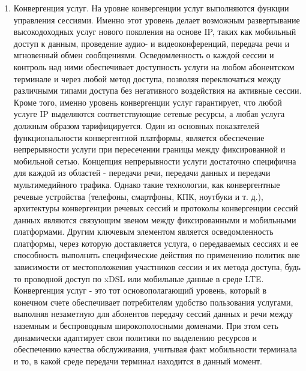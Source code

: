 \begin{enumerate}
\item Конвергенция услуг. На уровне конвергенции услуг выполняются функции управления сессиями. Именно этот уровень делает возможным развертывание высокодоходных услуг нового поколения на основе IP, таких как мобильный доступ к данным, проведение аудио- и видеоконференций, передача речи и мгновенный обмен сообщениями. Осведомленность о каждой сессии и контроль над ними обеспечивает доступность услуги на любом абонентском терминале и через любой метод доступа, позволяя переключаться между различными типами доступа без негативного воздействия на активные сессии. Кроме того, именно уровень конвергенции услуг гарантирует, что любой услуге IP выделяются соответствующие сетевые ресурсы, а любая услуга должным образом тарифицируется. Один из основных показателей функциональности конвергентной платформы, является обеспечение непрерывности услуги при пересечении границы между фиксированной и мобильной сетью.
Концепция непрерывности услуги достаточно специфична для каждой из областей - передачи речи, передачи данных и передачи мультимедийного трафика. 
Однако такие технологии, как конвергентные речевые устройства (телефоны, смартфоны, КПК, ноутбуки и т. д.), архитектуры конвергенции речевых сессий и протоколы конвергенции сессий данных являются связующим звеном между фиксированными и мобильными платформами. Другим ключевым элементом является осведомленность платформы, через которую доставляется услуга, о передаваемых сессиях и ее способность выполнять специфические действия по применению политик вне зависимости от местоположения участников сессии и их метода доступа, будь то проводной доступ по xDSL или мобильные данные в среде LTE. Конвергенция услуг - это тот основополагающий уровень, который в конечном счете обеспечивает потребителям удобство пользования услугами, выполняя незаметную для абонентов передачу сессий данных и речи между наземным и беспроводным широкополосными доменами. При этом сеть динамически адаптирует свои политики по выделению ресурсов и обеспечению качества обслуживания, учитывая факт мобильности терминала и то, в какой среде передачи терминал находится в данный момент.


\end{enumerate}
